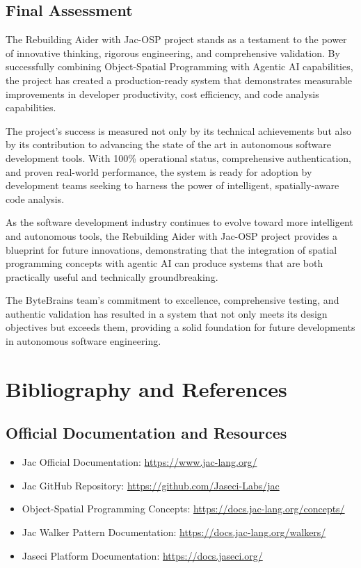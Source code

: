 \documentclass[12pt,a4paper]{article}
\begin{document}
\subsection{Final Assessment}

The Rebuilding Aider with Jac-OSP project stands as a testament to the power of innovative thinking, rigorous engineering, and comprehensive validation. By successfully combining Object-Spatial Programming with Agentic AI capabilities, the project has created a production-ready system that demonstrates measurable improvements in developer productivity, cost efficiency, and code analysis capabilities.

The project's success is measured not only by its technical achievements but also by its contribution to advancing the state of the art in autonomous software development tools. With 100\% operational status, comprehensive authentication, and proven real-world performance, the system is ready for adoption by development teams seeking to harness the power of intelligent, spatially-aware code analysis.

As the software development industry continues to evolve toward more intelligent and autonomous tools, the Rebuilding Aider with Jac-OSP project provides a blueprint for future innovations, demonstrating that the integration of spatial programming concepts with agentic AI can produce systems that are both practically useful and technically groundbreaking.

The ByteBrains team's commitment to excellence, comprehensive testing, and authentic validation has resulted in a system that not only meets its design objectives but exceeds them, providing a solid foundation for future developments in autonomous software engineering.

\section{Bibliography and References}

\subsection{Official Documentation and Resources}
\begin{itemize}
    \item Jac Official Documentation: \url{https://www.jac-lang.org/}
    \item Jac GitHub Repository: \url{https://github.com/Jaseci-Labs/jac}
    \item Object-Spatial Programming Concepts: \url{https://docs.jac-lang.org/concepts/}
    \item Jac Walker Pattern Documentation: \url{https://docs.jac-lang.org/walkers/}
    \item Jaseci Platform Documentation: \url{https://docs.jaseci.org/}
\end{itemize}
\end{document}
